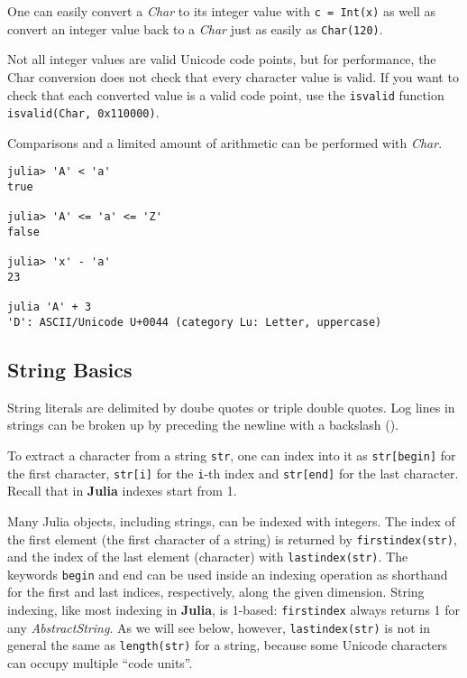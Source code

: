 \documentclass[
]{article}
\begin{document}
One can easily convert a \emph{Char} to its integer value with
\texttt{c\ =\ Int(\textquotesingle{}x\textquotesingle{})} as well as
convert an integer value back to a \emph{Char} just as easily as
\texttt{Char(120)}.

Not all integer values are valid Unicode code points, but for
performance, the Char conversion does not check that every character
value is valid. If you want to check that each converted value is a
valid code point, use the \texttt{isvalid} function
\texttt{isvalid(Char,\ 0x110000)}.

Comparisons and a limited amount of arithmetic can be performed with
\emph{Char}.

\begin{verbatim}
julia> 'A' < 'a'
true

julia> 'A' <= 'a' <= 'Z'
false

julia> 'x' - 'a'
23

julia 'A' + 3
'D': ASCII/Unicode U+0044 (category Lu: Letter, uppercase)
\end{verbatim}

\hypertarget{string-basics}{%
\subsection{String Basics}\label{string-basics}}

String literals are delimited by doube quotes or triple double quotes.
Log lines in strings can be broken up by preceding the newline with a
backslash ().

To extract a character from a string \texttt{str}, one can index into it
as \texttt{str{[}begin{]}} for the first character, \texttt{str{[}i{]}}
for the \texttt{i}-th index and \texttt{str{[}end{]}} for the last
character. Recall that in \textbf{Julia} indexes start from 1.

Many Julia objects, including strings, can be indexed with integers. The
index of the first element (the first character of a string) is returned
by \texttt{firstindex(str)}, and the index of the last element
(character) with \texttt{lastindex(str)}. The keywords \texttt{begin}
and end can be used inside an indexing operation as shorthand for the
first and last indices, respectively, along the given dimension. String
indexing, like most indexing in \textbf{Julia}, is 1-based:
\texttt{firstindex} always returns 1 for any \emph{AbstractString}. As
we will see below, however, \texttt{lastindex(str)} is not in general
the same as \texttt{length(str)} for a string, because some Unicode
characters can occupy multiple ``code units''.
\end{document}
